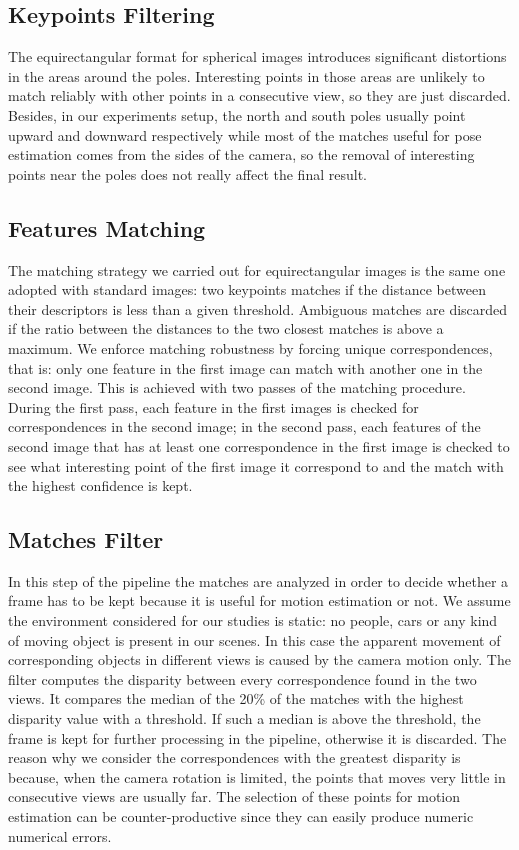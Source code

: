 \subsection{Keypoints Filtering}
The equirectangular format for spherical images introduces significant 
distortions in the areas around the poles. Interesting points in those areas 
are unlikely to match reliably with other points in a consecutive view, 
so they are just discarded.
Besides, in our experiments setup, the north and south poles usually point 
upward and downward respectively while most of the matches useful for pose 
estimation comes from the sides of the camera, so the removal of interesting 
points near the poles does not really affect the final result.

\subsection{Features Matching}
The matching strategy we carried out for equirectangular images is the same one 
adopted with standard images: two keypoints matches if the distance between 
their descriptors is less than a given threshold. Ambiguous matches 
are discarded if the ratio between the distances to the two closest matches is 
above a maximum.
We enforce matching robustness by forcing unique correspondences, that is:
only one feature in the first image can match with another one in the second
image. This is achieved with two passes of the matching procedure. During the 
first pass, each feature in the first images is checked for correspondences in
the second image; in the second pass, each features of the second image that 
has at least one correspondence in the first image is checked to see what 
interesting point of the first image it correspond to and the match with the
highest confidence is kept.

\subsection{Matches Filter}
In this step of the pipeline the matches are analyzed in order to decide 
whether a frame has to be kept because it is useful for motion estimation or
not.
We assume the environment considered for our studies is static: no people, 
cars or any kind of moving object is present in our scenes. In this case the 
apparent movement of corresponding objects in different views is caused by 
the camera motion only.
The filter computes the disparity between every correspondence found in the 
two views. It compares the median of the 20\% of the matches with the highest 
disparity value with a threshold. If such a median is above 
the threshold, the frame is kept for further processing in the pipeline, 
otherwise it is discarded.
The reason why we consider the correspondences with the greatest disparity is 
because, when the camera rotation is limited, the points that moves very little 
in consecutive views are usually far. The selection of these points for motion 
estimation can be counter-productive since they can easily produce numeric 
numerical errors. 

